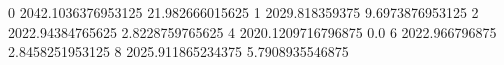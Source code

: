 0 2042.1036376953125 21.982666015625
1 2029.818359375 9.6973876953125
2 2022.94384765625 2.8228759765625
4 2020.1209716796875 0.0
6 2022.966796875 2.8458251953125
8 2025.911865234375 5.7908935546875
